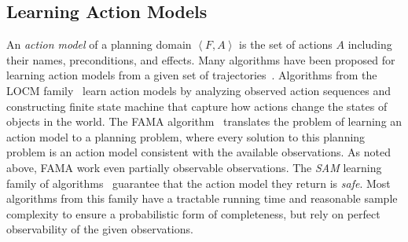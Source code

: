 \documentclass[letterpaper]{article} %
\newcommand{\tuple}[1]{\ensuremath{\left \langle #1 \right \rangle }}
\newcommand{\sam}{\textit{SAM}\xspace}
\newcommand{\roni}[1]{{\textcolor{green}{[Roni: #1]}}}
\begin{document}
\subsection{Learning Action Models} 
An \emph{action model} of a planning domain $\tuple{F,A}$ is the set of actions $A$ including their names, preconditions, and effects. 
Many algorithms have been proposed for learning action models from a given set of trajectories~\citep{cresswell2013acquiring,yang2007learning,aineto2019learning,juba2021safe}. 
Algorithms from the LOCM family~\cite{cresswell2011generalised, cresswell2013acquiring} learn action models by analyzing observed action sequences and constructing finite state machine that capture how actions change the states of objects in the world. 
The FAMA algorithm~\citep{aineto2019learning} translates the problem of learning an action model to a planning problem, where every solution to this planning problem is an action model consistent with the available observations. As noted above, FAMA work even partially observable observations. 
The \sam learning family of algorithms~\cite{stern2017efficientAndSafe,juba2021safe,juba2022learning,mordoch2022collaborative}
guarantee that the action model they return is \emph{safe}. Most algorithms from this family have a tractable running time and reasonable sample complexity to ensure a probabilistic form of completeness, but rely on perfect observability of the given observations. 
\end{document}
